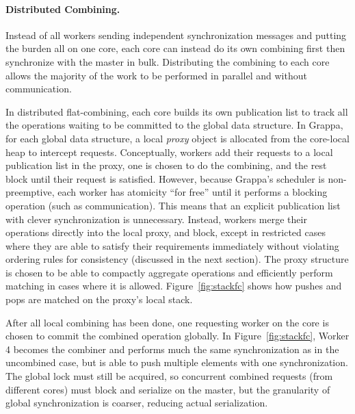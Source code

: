 \paragraph{Distributed Combining.}
Instead of all workers sending independent synchronization messages and putting the burden all on one core, each core can instead do its own combining first then synchronize with the master in bulk.
Distributing the combining to each core allows the majority of the work to be performed in parallel and without communication.


In distributed flat-combining, each core builds its own publication list to track all the operations waiting to be committed to the global data structure.
In Grappa, for each global data structure, a local \emph{proxy} object is allocated from the core-local heap to intercept requests.
Conceptually, workers add their requests to a local publication list in the proxy, one is chosen to do the combining, and the rest block until their request is satisfied.
However, because Grappa's scheduler is non-preemptive, each worker has atomicity ``for free'' until it performs a blocking operation (such as communication).
This means that an explicit publication list with clever synchronization is unnecessary.
Instead, workers merge their operations directly into the local proxy, and 
block, except in restricted cases where they are able to satisfy their requirements immediately without violating ordering rules for consistency (discussed in the next section).
The proxy structure is chosen to be able to compactly aggregate operations and efficiently perform matching in cases where it is allowed. Figure~\ref{fig:stackfc} shows how pushes and pops are matched on the proxy's local stack.

After all local combining has been done, one requesting worker on the core is chosen to commit the combined operation globally. In Figure~\ref{fig:stackfc}, Worker 4 becomes the combiner and performs much the same synchronization as in the uncombined case, but is able to push multiple elements with one synchronization. The global lock must still be acquired, so concurrent combined requests (from different cores) must block and serialize on the master, but the granularity of global synchronization is coarser, reducing actual serialization.

